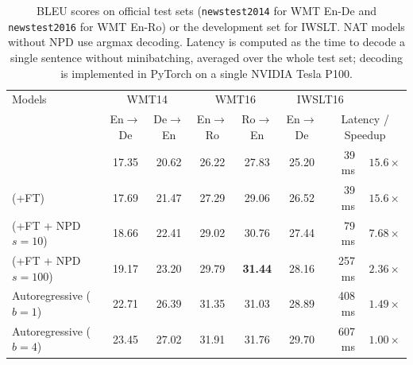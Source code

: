 \begin{table}[t]
\small
  \centering
    \begin{tabular}{l|cccc|crr}
    \toprule
    Models                  & \multicolumn{2}{c}{WMT14} & \multicolumn{2}{c|}{WMT16} & \multicolumn{2}{c}{IWSLT16} \\
    \multicolumn{1}{c}{}   & \multicolumn{1}{|c}{En$\rightarrow$De} & \multicolumn{1}{c}{De$\rightarrow$En} & \multicolumn{1}{c}{En$\rightarrow$Ro} & \multicolumn{1}{c|}{Ro$\rightarrow$En} & \multicolumn{1}{c}{En$\rightarrow$De} & \multicolumn{2}{c}{Latency / Speedup}  \\
    \midrule
    
     
         \model{}                       & 17.35 & 20.62& 26.22 & 27.83&  25.20 & 39 ms & $15.6 \times$ \\
         
         \model{} (+FT)                 & 17.69& 21.47 & 27.29 & 29.06&  26.52 & 39 ms & $15.6 \times$\\
         
         
         \model{} (+FT + NPD $s=10$)     & 18.66 & 22.41& 29.02&  30.76 & 27.44 & 79 ms & $7.68 \times$\\
         
         \model{} (+FT + NPD $s=100$)    & 19.17 & 23.20 & 29.79&  \textbf{31.44}     & 28.16 & 257 ms & $2.36 \times$ \\
         \midrule
         Autoregressive ($b=1$)         & 22.71 & 26.39 & 31.35 & 31.03 & 28.89 & 408 ms & $1.49 \times$ \\
    	 Autoregressive ($b=4$)         & 23.45 & 27.02 & 31.91 & 31.76 & 29.70 & 607 ms & $1.00 \times$ \\
    		
    
    \bottomrule
    \end{tabular}
     \caption{BLEU scores on official test sets (\texttt{newstest2014} for WMT En-De and \texttt{newstest2016} for WMT En-Ro) or the development set for IWSLT. NAT models without NPD use argmax decoding. Latency is computed as the time to decode a single sentence without minibatching, averaged over the whole test set; decoding is implemented in PyTorch on a single NVIDIA Tesla P100.}
     \vspace{-10pt}
  \label{tab:bleu}%
\end{table}

